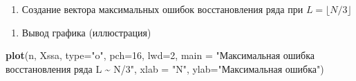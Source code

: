 \documentclass[
]{article}
\newenvironment{Shaded}{\begin{snugshade}}{\end{snugshade}}
\newcommand{\AttributeTok}[1]{\textcolor[rgb]{0.13,0.29,0.53}{#1}}
\newcommand{\CommentTok}[1]{\textcolor[rgb]{0.56,0.35,0.01}{\textit{#1}}}
\newcommand{\ControlFlowTok}[1]{\textcolor[rgb]{0.13,0.29,0.53}{\textbf{#1}}}
\newcommand{\DecValTok}[1]{\textcolor[rgb]{0.00,0.00,0.81}{#1}}
\newcommand{\FunctionTok}[1]{\textcolor[rgb]{0.13,0.29,0.53}{\textbf{#1}}}
\newcommand{\NormalTok}[1]{#1}
\newcommand{\OtherTok}[1]{\textcolor[rgb]{0.56,0.35,0.01}{#1}}
\newcommand{\SpecialCharTok}[1]{\textcolor[rgb]{0.81,0.36,0.00}{\textbf{#1}}}
\newcommand{\StringTok}[1]{\textcolor[rgb]{0.31,0.60,0.02}{#1}}
\providecommand{\tightlist}{%
  \setlength{\itemsep}{0pt}\setlength{\parskip}{0pt}}
\begin{document}
\begin{enumerate}
\def\labelenumi{\arabic{enumi}.}
\tightlist
\item
  Создание вектора максимальных ошибок восстановления ряда при
  \(L = \lfloor N/3\rfloor\)
\end{enumerate}

\begin{Shaded}
\end{Shaded}

\begin{enumerate}
\def\labelenumi{\arabic{enumi}.}
\setcounter{enumi}{1}
\tightlist
\item
  Вывод графика (иллюстрация)
\end{enumerate}

\begin{Shaded}
\begin{Highlighting}[]
\FunctionTok{plot}\NormalTok{(n, Xssa, }\AttributeTok{type=}\StringTok{"o"}\NormalTok{, }\AttributeTok{pch=}\DecValTok{16}\NormalTok{, }\AttributeTok{lwd=}\DecValTok{2}\NormalTok{, }\AttributeTok{main =} \StringTok{"Максимальная ошибка восстановления ряда L \textasciitilde{} N/3"}\NormalTok{,}
     \AttributeTok{xlab =} \StringTok{"N"}\NormalTok{, }\AttributeTok{ylab=}\StringTok{"Максимальная ошибка"}\NormalTok{)}
\end{Highlighting}
\end{Shaded}
\end{document}
